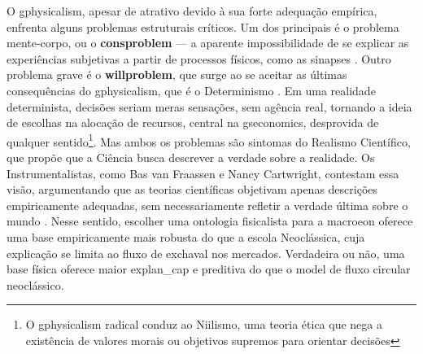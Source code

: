 \documentclass[./main.tex]{subfiles}
\begin{document}
\par O \gls{gphysicalism}, apesar de atrativo devido à sua forte adequação empírica, enfrenta alguns problemas estruturais críticos. Um dos principais é o problema mente-corpo, ou o \textbf{\gls{consproblem}} — a aparente impossibilidade de se explicar as experiências subjetivas a partir de processos físicos, como as sinapses \cite{sep-consciousness}. Outro problema grave é o \textbf{\gls{willproblem}}, que surge ao se aceitar as últimas consequências do \gls{gphysicalism}, que é o Determinismo \cite{sep-skepticism}. Em uma realidade determinista, decisões seriam meras sensações, sem agência real, tornando a ideia de escolhas na alocação de recursos, central na \gls{gseconomics}, desprovida de qualquer sentido\footnote{O \gls{gphysicalism} radical conduz ao Niilismo, uma \gls{teoria} ética que nega a existência de valores morais ou objetivos supremos para orientar decisões}. Mas ambos os problemas são sintomas do Realismo Científico, que propõe que a Ciência busca descrever a verdade sobre a realidade. Os Instrumentalistas, como Bas van Fraassen e Nancy Cartwright, contestam essa visão, argumentando que as teorias científicas objetivam apenas descrições empiricamente adequadas, sem necessariamente refletir a verdade última sobre o mundo \cite{bas1980, nancy1983}. Nesse sentido, escolher uma ontologia fisicalista para a \gls{macroeon} oferece uma base empiricamente mais robusta do que a escola Neoclássica, cuja explicação se limita ao fluxo de \gls{exchaval} nos mercados. Verdadeira ou não, uma base física oferece maior \gls{explan_cap} e preditiva do que o \gls{model} de fluxo circular neoclássico.
\end{document}
